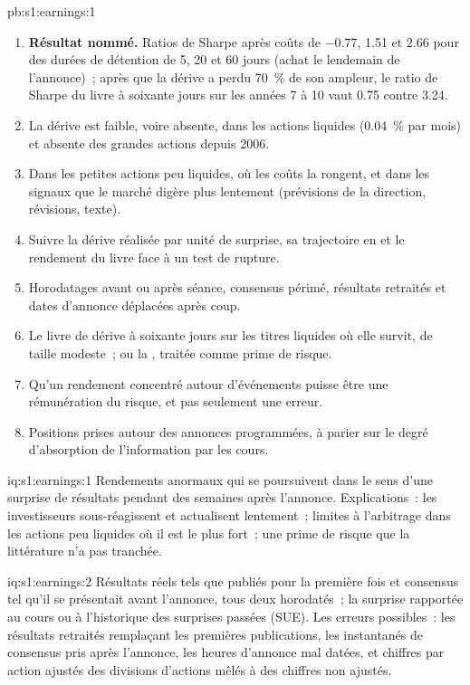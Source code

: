\begin{solution}{pb:s1:earnings:1}
\begin{enumerate}
\item \textbf{Résultat nommé.} Ratios de Sharpe après coûts de $-0.77$, 1.51 et 2.66 pour des durées de détention de 5, 20 et 60 jours (achat le lendemain
de l'annonce)~; après que la dérive a perdu 70~\% de son ampleur, le ratio de Sharpe du livre à soixante jours sur les années 7 à 10 vaut 0.75 contre 3.24.
\item La dérive est faible, voire absente, dans les actions liquides (0.04~\% par mois) et absente des grandes actions depuis 2006.
\item Dans les petites actions peu liquides, où les coûts la rongent, et dans les signaux que le marché digère plus lentement (prévisions de la direction, révisions, texte).
\item Suivre la dérive réalisée par unité de surprise, sa trajectoire en  et le rendement du livre face à un test de rupture.
\item Horodatages avant ou après séance, consensus périmé, résultats retraités et dates d'annonce déplacées après coup.
\item Le livre de dérive à soixante jours sur les titres liquides où elle survit, de taille modeste~; ou la , traitée comme prime de risque.
\item Qu'un rendement concentré autour d'événements puisse être une rémunération du risque, et pas seulement une erreur.
\item Positions prises autour des annonces programmées, à parier sur le degré d'absorption de l'information par les cours.
\end{enumerate}
\end{solution}

\begin{solution}{iq:s1:earnings:1}
Rendements anormaux qui se poursuivent dans le sens d'une surprise de résultats pendant des semaines après l'annonce. Explications~: les investisseurs sous-réagissent et actualisent lentement~;
limites à l'arbitrage dans les actions peu liquides où il est le plus fort~; une prime de risque que la littérature n'a pas tranchée.
\end{solution}

\begin{solution}{iq:s1:earnings:2}
Résultats réels tels que publiés pour la première fois et consensus tel qu'il se présentait avant l'annonce, tous deux horodatés~; la surprise rapportée au cours ou à l'historique
des surprises passées (SUE). Les erreurs possibles~: les résultats retraités remplaçant les premières publications, les instantanés de consensus pris après l'annonce, les heures d'annonce
mal datées, et chiffres par action ajustés des divisions d'actions mêlés à des chiffres non ajustés.
\end{solution}


